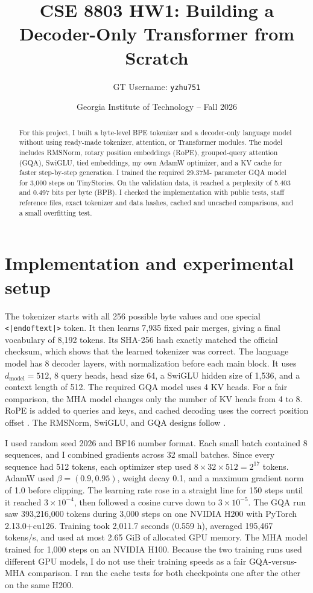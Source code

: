 \documentclass[10pt]{article}
\title{\vspace{-2.0em}\textbf{CSE 8803 HW1: Building a Decoder-Only Transformer from Scratch}}
\author{GT Username: \texttt{yzhu751}}
\date{Georgia Institute of Technology -- Fall 2026}
\begin{document}
\maketitle
\vspace{-1.2em}

\begin{abstract}
For this project, I built a byte-level BPE tokenizer and a decoder-only language model without
using ready-made tokenizer, attention, or Transformer modules. The model includes RMSNorm, rotary
position embeddings (RoPE), grouped-query attention (GQA), SwiGLU, tied embeddings, my own AdamW
optimizer, and a KV cache for faster step-by-step generation. I trained the required 29.37M-
parameter GQA model for 3,000 steps on TinyStories. On the validation data, it reached a perplexity
of 5.403 and 0.497 bits per byte (BPB). I checked the implementation with public tests, staff
reference files, exact tokenizer and data hashes, cached and uncached comparisons, and a small
overfitting test.
\end{abstract}

\section{Implementation and experimental setup}

The tokenizer starts with all 256 possible byte values and one special
\texttt{<|endoftext|>} token. It then learns 7,935 fixed pair merges, giving a final vocabulary of
8,192 tokens. Its SHA-256 hash exactly matched the official checksum, which shows that the learned
tokenizer was correct. The language model has 8 decoder layers, with normalization before each
main block. It uses $d_{\mathrm{model}}=512$, 8 query heads, head size 64, a SwiGLU hidden size of
1,536, and a context length of 512. The required GQA model uses 4 KV heads. For a fair comparison,
the MHA model changes only the number of KV heads from 4 to 8. RoPE is added to queries and keys,
and cached decoding uses the correct position offset \cite{su2021roformer}. The RMSNorm, SwiGLU,
and GQA designs follow \cite{zhang2019rmsnorm,shazeer2020glu,ainslie2023gqa}.

I used random seed 2026 and BF16 number format. Each small batch contained 8 sequences, and I
combined gradients across 32 small batches. Since every sequence had 512 tokens, each optimizer
step used $8\times32\times512=2^{17}$ tokens. AdamW used $\beta=(0.9,0.95)$, weight decay 0.1,
and a maximum gradient norm of 1.0 before clipping. The learning rate rose in a straight line for
150 steps until it reached $3\times10^{-4}$, then followed a cosine curve down to
$3\times10^{-5}$. The GQA run saw 393,216,000 tokens during 3,000 steps on one NVIDIA H200 with
PyTorch 2.13.0+cu126. Training took 2,011.7 seconds (0.559 h), averaged 195,467 tokens/s, and used
at most 2.65 GiB of allocated GPU memory. The MHA model trained for 1,000 steps on an NVIDIA H100.
Because the two training runs used different GPU models, I do not use their training speeds as a
fair GQA-versus-MHA comparison. I ran the cache tests for both checkpoints one after the other on
the same H200.
\end{document}
